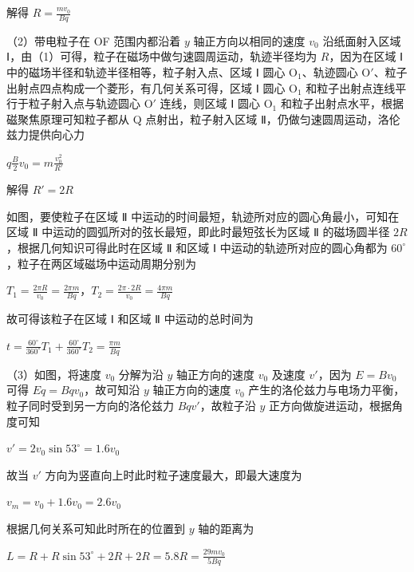 \documentclass[\gkver]{gaokaozhenti}
\begin{document}
\begin{enumerate}
{解得 $R = \frac{mv_{0}}{Bq}$

（2）带电粒子在 OF 范围内都沿着 $y$ 轴正方向以相同的速度 $v_{0}$ 沿纸面射入区域 Ⅰ，由（1）可得，粒子在磁场中做匀速圆周运动，轨迹半径均为 $R$，因为在区域 Ⅰ 中的磁场半径和轨迹半径相等，粒子射入点、区域 Ⅰ 圆心 O$_{1}$、轨迹圆心 O$'$、粒子出射点四点构成一个菱形，有几何关系可得，区域 Ⅰ 圆心 O$_{1}$ 和粒子出射点连线平行于粒子射入点与轨迹圆心 O$'$ 连线，则区域 Ⅰ 圆心 O$_{1}$ 和粒子出射点水平，根据磁聚焦原理可知粒子都从 Q 点射出，粒子射入区域 Ⅱ，仍做匀速圆周运动，洛伦兹力提供向心力

$q\frac{B}{2}v_{0} = m\frac{v_{0}^{2}}{R'}$

解得 $R' = 2R$

如图，要使粒子在区域 Ⅱ 中运动的时间最短，轨迹所对应的圆心角最小，可知在区域 Ⅱ 中运动的圆弧所对的弦长最短，即此时最短弦长为区域 Ⅱ 的磁场圆半径 $2R$，根据几何知识可得此时在区域 Ⅱ 和区域 Ⅰ 中运动的轨迹所对应的圆心角都为 $60^\circ$，粒子在两区域磁场中运动周期分别为

$T_{1} = \frac{2\pi R}{v_{0}} = \frac{2\pi m}{Bq}$，$T_{2} = \frac{2\pi\cdot2R}{v_{0}} = \frac{4\pi m}{Bq}$


故可得该粒子在区域 Ⅰ 和区域 Ⅱ 中运动的总时间为

$t = \frac{60^\circ}{360^\circ}T_{1} + \frac{60^\circ}{360^\circ}T_{2} = \frac{\pi m}{Bq}$

（3）如图，将速度 $v_{0}$ 分解为沿 $y$ 轴正方向的速度 $v_{0}$ 及速度 $v'$，因为 $E = Bv_{0}$ 可得 $Eq = Bqv_{0}$，故可知沿 $y$ 轴正方向的速度 $v_{0}$ 产生的洛伦兹力与电场力平衡，粒子同时受到另一方向的洛伦兹力 $Bqv'$，故粒子沿 $y$ 正方向做旋进运动，根据角度可知

$v' = 2v_{0}\sin53^\circ = 1.6v_{0}$


故当 $v'$ 方向为竖直向上时此时粒子速度最大，即最大速度为

$v_{m} = v_{0} + 1.6v_{0} = 2.6v_{0}$

根据几何关系可知此时所在的位置到 $y$ 轴的距离为

$L = R + R\sin53^\circ + 2R + 2R = 5.8R = \frac{29mv_{0}}{5Bq}$
}

\end{enumerate}
\end{document}
